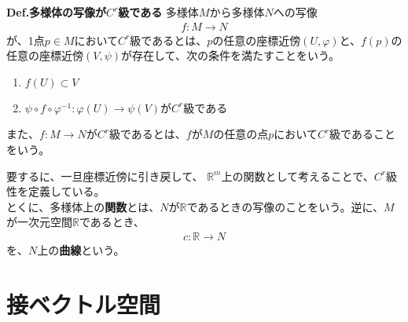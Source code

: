 \documentclass[a4paper,11pt]{jsarticle}
\numberwithin{equation}{section}
\begin{document}
\begin{itembox}[l]{\textbf{Def.多様体の写像が$C^r$級である}}
  多様体$M$から多様体$N$への写像
  \begin{align}
    f: M \to N
  \end{align}
  が、1点$p \in M$において$C^r$級であるとは、$p$の任意の座標近傍$(U, \varphi)$と、$f(p)$の任意の座標近傍$(V, \psi)$が存在して、次の条件を満たすことをいう。
  \begin{enumerate}
    \item $f(U) \subset V$
    \item $\psi \circ f \circ \varphi^{-1}: \varphi(U) \to \psi(V)$が$C^r$級である
  \end{enumerate}
  また、$f: M \to N$が$C^r$級であるとは、$f$が$M$の任意の点$p$において$C^r$級であることをいう。
\end{itembox}
要するに、一旦座標近傍に引き戻して、
$\mathbb{R}^m$上の関数として考えることで、$C^r$級性を定義している。\\
とくに、多様体上の\textbf{関数}とは、$N$が$\mathbb{R}$であるときの写像のことをいう。逆に、$M$が一次元空間$\mathbb{R}$であるとき、
\begin{align}
  c: \mathbb{R} \to N
\end{align}
を、$N$上の\textbf{曲線}という。

\section{接ベクトル空間}
\end{document}

